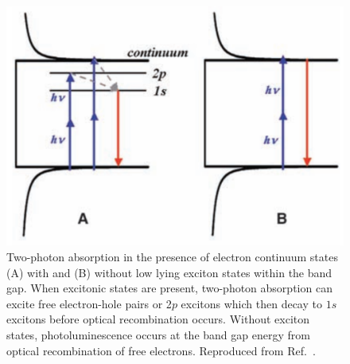 \begin{figure}[ht]
	\centering
	\includegraphics[scale=0.3]{images/chapter_optical_props/cnt_two_photon}
	\caption{ Two-photon absorption in the presence of electron continuum states (A) with and (B) without low lying exciton states within the band gap. When excitonic states are present, two-photon absorption can excite free electron-hole pairs or 2$p$ excitons which then decay to $1s$ excitons before optical recombination occurs. Without exciton states, photoluminescence occurs at the band gap energy from optical recombination of free electrons. Reproduced from Ref.\ \cite{wang2005optical}. }
	\label{fig:cnt_two_photon}
\end{figure}



